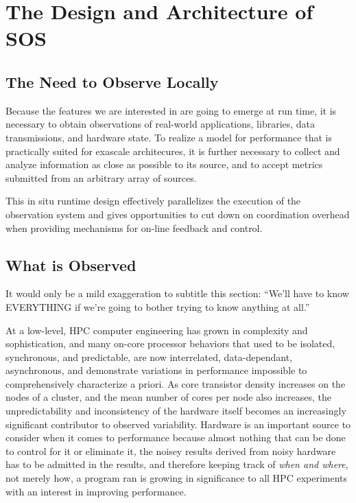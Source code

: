 
\section{The Design and Architecture of SOS}

\subsection{The Need to Observe Locally}

Because the features we are interested in are going to emerge at run
time, it is necessary to obtain observations of real-world
applications, libraries, data transmissions, and hardware state. To
realize a model for performance that is practically suited for
exascale architecures, it is further necessary to collect and analyze
information as close as possible to its source, and to accept metrics
submitted from an arbitrary array of sources.

This in situ runtime design effectively parallelizes the execution of
the observation system and gives opportunities to cut down on
coordination overhead when providing mechanisms for on-line feedback
and control.



\subsection{What is Observed}

It would only be a mild exaggeration to subtitle this section: ``We'll
have to know EVERYTHING if we're going to bother trying to know
anything at all.''

At a low-level, HPC computer engineering has grown in complexity and
sophistication, and many on-core processor behaviors that used to be
isolated, synchronous, and predictable, are now interrelated,
data-dependant, asynchronous, and demonstrate variations in
performance impossible to comprehensively characterize a priori. As
core transistor density increases on the nodes of a cluster, and the
mean number of cores per node also increases, the unpredictability and
inconsistency of the hardware itself becomes an increasingly
significant contributor to observed variability. Hardware is an
important source to consider when it comes to performance because
almost nothing that can be done to control for it or eliminate it, the
noisey results derived from noisy hardware has to be admitted in the
results, and therefore keeping track of \textit{when and where}, not
merely how, a program ran is growing in significance to all HPC experiments
with an interest in improving performance.

